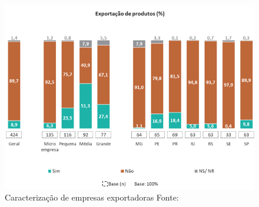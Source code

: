 \begin{figure}[h]
    \centering
    \includegraphics[scale=0.85]{Imagens/Exportacao_2.PNG}
    \caption{Caracterização de empresas exportadoras  Fonte: \cite{innovare}}
\end{figure}
